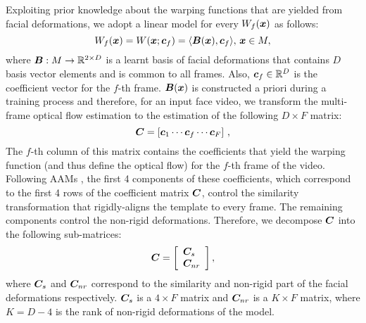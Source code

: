 Exploiting prior knowledge about the warping functions that are yielded from
facial deformations, we adopt a linear model for every $W_f(\boldsymbol{x})$ as follows:
\begin{equation}
    W_f(\boldsymbol{x}) = W(\boldsymbol{x};\boldsymbol{c}_f) = \langle \boldsymbol{B}(\boldsymbol{x}) , \boldsymbol{c}_f \rangle, \,\boldsymbol{x} \in M,
\end{equation}
where $\boldsymbol{B}:M\rightarrow \mathbb{R}^{2 \times D}$ is a learnt basis of facial deformations that
contains $D$ basis vector elements and is common to all frames. Also,
$\boldsymbol{c}_f\in\mathbb{R}^D$ is the coefficient vector for the $f$-th frame. $\boldsymbol{B}(\boldsymbol{x})$ is 
constructed a priori during a training process and
therefore, for an input face video, we transform the multi-frame optical flow
estimation to the estimation of the following $D\times F$ matrix:
\begin{equation}
    \boldsymbol{C} = \left[ \boldsymbol{c}_1 \cdots \boldsymbol{c}_f \cdots \boldsymbol{c}_F \right] \,,
\end{equation}
The $f$-th column of this matrix contains the coefficients that yield the
warping function (and thus define the optical flow) for the $f$-th frame of the
video. Following AAMs \cite{cootes2001active}, the first 4 components of these coefficients, 
which correspond to the first 4 rows of the coefficient matrix $\boldsymbol{C}$, 
control the similarity transformation that rigidly-aligns the template to every 
frame. The remaining components control the non-rigid deformations. 
Therefore, we decompose $\boldsymbol{C}$ into the following sub-matrices:
\begin{equation}\label{E:C_DEC}
    \boldsymbol{C} =
        \left[
            \begin{array}{l}
                \boldsymbol{C}_s\\
                \boldsymbol{C}_{nr} 
            \end{array}
        \right],
\end{equation}
where $\boldsymbol{C}_s$ and $\boldsymbol{C}_{nr}$ correspond to the similarity and non-rigid 
part of the facial deformations respectively. 
$\boldsymbol{C}_s$ is a $4\times F$ matrix and $\boldsymbol{C}_{nr}$ is a $K \times F$ matrix, 
where $K=D-4$ is the rank of non-rigid deformations of the model.
